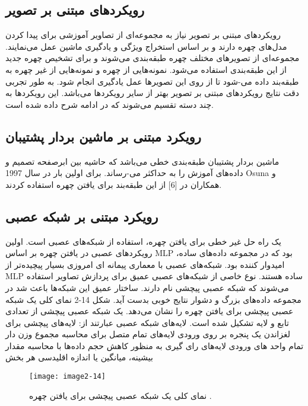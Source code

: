  \subsection{رویکردهای مبتنی بر تصویر}
رویکردهای مبتنی بر تصویر نیاز به مجموعه‌ای از تصاویر آموزشی برای پیدا کردن مدل‌های چهره دارند و بر اساس استخراج ویژگی و یادگیری ماشین عمل می‌نمایند. مجموعه‌ای از تصویر‌های مختلف چهره طبقه‌بندی می‌شوند و برای تشخیص چهره جدید از این طبقه‌بندی استفاده می‌شود. نمونه‌هایی از چهره و نمونه‌هایی از غیر چهره به طبقه‌بند داده می-شود تا از روی این تصویرها عمل یادگیری انجام شود. به طور تجربی دقت نتایج رویکردهای مبتنی بر تصویر بهتر از سایر رویکرد‌ها می‌باشد. این رویکردها به چند دسته تقسیم می‌شوند که در ادامه شرح داده شده است. 

 \subsection{رویکرد مبتنی بر ماشین بردار پشتیبان}

ماشین‌ بردار پشتیبان  طبقه‌بندی خطی می‌باشد که حاشیه بین ابرصفحه تصمیم و داده‌های آموزش را به حداکثر می-رساند. برای اولین بار در سال 1997 Osuna و همکاران در [6] از این طبقه‌بند برای یافتن چهره استفاده کردند.

 \subsection{رویکرد مبتنی بر شبکه‌ عصبی}
 
یک راه حل غیر خطی برای یافتن چهره، استفاده از شبکه‌های عصبی است. اولین رویکردهای عصبی در یافتن چهره بر اساس MLP  بود که در مجموعه داده‌های ساده، امیدوار کننده بود. شبکه‌های عصبی با معماری پیمانه ای  امروزی بسیار پیچیده‌تر از MLP ساده هستند. نوع خاصی از شبکه‌های عصبی عمیق برای پردازش تصاویر استفاده می‌شوند که شبکه عصبی پیچشی  نام دارند. ساختار عمیق این شبکه‌ها باعث شد در مجموعه داده‌های بزرگ و دشوار نتایج خوبی بدست آید. شکل ‏2-14 نمای کلی یک شبکه عصبی پیچشی برای یافتن چهره را نشان می‌دهد. یک شبکه عصبی پیچشی از تعدادی تابع و لایه تشکیل شده است. لایه‌های شبکه عصبی عبارتند از:
لایه‌های پیچشی  برای لغزاندن یک پنجره بر روی ورودی
لایه‌های تمام متصل  برای محاسبه مجموع وزن دار تمام واحد های ورودی
لایه‌های رای گیری  به منظور کاهش حجم داده‌ها با محاسبه مقدار بیشینه، میانگین یا اندازه اقلیدسی هر بخش
 
\begin{figure}[h]
\centering
  \texttt{[image: image2-14]}
  \caption{نمای کلی یک شبکه عصبی پیچشی برای یافتن چهره \cite{ref1}.}
  \label{image2-14}
\end{figure}

